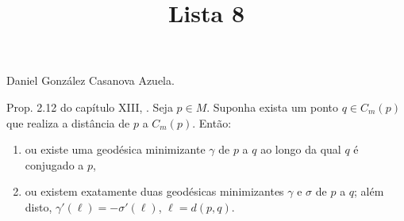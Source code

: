 



\title{Lista 8}
\maketitle

\label{section-phantom}

Daniel González Casanova Azuela.

\begin{exercise}
\label{exercise-l8-1}
Prop. 2.12 do capítulo XIII, \cite{doc}. Seja $p \in M$. 
Suponha exista um ponto $q \in C_m(p)$ que realiza a distância de $p$ a 
$C_m(p)$. Então:
\begin{enumerate}
\item ou existe uma geodésica 
minimizante $\gamma$ de $p$ a $q$ ao longo da qual $q$ é 
conjugado a $p$,
\item ou existem exatamente duas geodésicas 
minimizantes $\gamma$ e $\sigma$ de $p$ a $q$; além disto,
$\gamma'(\ell)=-\sigma'(\ell)$, 
$\ell=d(p,q)$. 
\end{enumerate}
\end{exercise}

